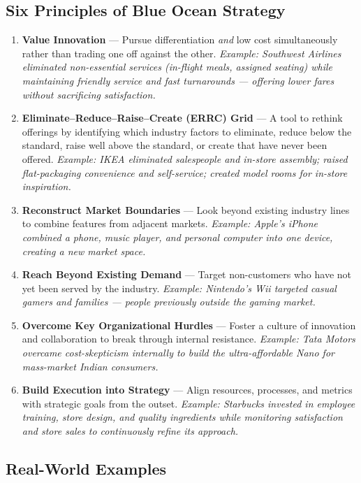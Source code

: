 \documentclass[11pt, letterpaper]{article}
\begin{document}
\subsection{Six Principles of Blue Ocean Strategy}

\begin{enumerate}[leftmargin=*, label=\textbf{\arabic*.}]
  \item \textbf{Value Innovation} --- Pursue differentiation \textit{and} low cost simultaneously rather than trading one off against the other. \textit{Example: Southwest Airlines eliminated non-essential services (in-flight meals, assigned seating) while maintaining friendly service and fast turnarounds --- offering lower fares without sacrificing satisfaction.}
  \item \textbf{Eliminate--Reduce--Raise--Create (ERRC) Grid} --- A tool to rethink offerings by identifying which industry factors to eliminate, reduce below the standard, raise well above the standard, or create that have never been offered. \textit{Example: IKEA eliminated salespeople and in-store assembly; raised flat-packaging convenience and self-service; created model rooms for in-store inspiration.}
  \item \textbf{Reconstruct Market Boundaries} --- Look beyond existing industry lines to combine features from adjacent markets. \textit{Example: Apple's iPhone combined a phone, music player, and personal computer into one device, creating a new market space.}
  \item \textbf{Reach Beyond Existing Demand} --- Target non-customers who have not yet been served by the industry. \textit{Example: Nintendo's Wii targeted casual gamers and families --- people previously outside the gaming market.}
  \item \textbf{Overcome Key Organizational Hurdles} --- Foster a culture of innovation and collaboration to break through internal resistance. \textit{Example: Tata Motors overcame cost-skepticism internally to build the ultra-affordable Nano for mass-market Indian consumers.}
  \item \textbf{Build Execution into Strategy} --- Align resources, processes, and metrics with strategic goals from the outset. \textit{Example: Starbucks invested in employee training, store design, and quality ingredients while monitoring satisfaction and store sales to continuously refine its approach.}
\end{enumerate}

\subsection{Real-World Examples}
\end{document}
